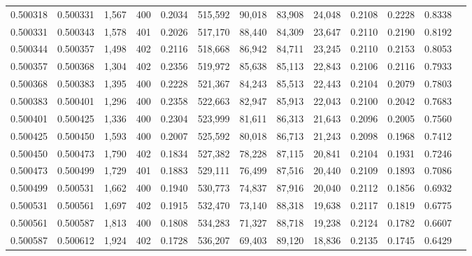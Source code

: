 \begin{tabular}{rrrrrrrrrrrrr}
0.500318 & 0.500331 & 1,567 & 400 &                                     0.2034 & 515,592 &  90,018 &  83,908 &  24,048 & 0.2108 & 0.2228 & 0.8338 \\
0.500331 & 0.500343 & 1,578 & 401 &                                     0.2026 & 517,170 &  88,440 &  84,309 &  23,647 & 0.2110 & 0.2190 & 0.8192 \\
0.500344 & 0.500357 & 1,498 & 402 &                                     0.2116 & 518,668 &  86,942 &  84,711 &  23,245 & 0.2110 & 0.2153 & 0.8053 \\
0.500357 & 0.500368 & 1,304 & 402 &                                     0.2356 & 519,972 &  85,638 &  85,113 &  22,843 & 0.2106 & 0.2116 & 0.7933 \\
0.500368 & 0.500383 & 1,395 & 400 &                                     0.2228 & 521,367 &  84,243 &  85,513 &  22,443 & 0.2104 & 0.2079 & 0.7803 \\
0.500383 & 0.500401 & 1,296 & 400 &                                     0.2358 & 522,663 &  82,947 &  85,913 &  22,043 & 0.2100 & 0.2042 & 0.7683 \\
0.500401 & 0.500425 & 1,336 & 400 &                                     0.2304 & 523,999 &  81,611 &  86,313 &  21,643 & 0.2096 & 0.2005 & 0.7560 \\
0.500425 & 0.500450 & 1,593 & 400 &                                     0.2007 & 525,592 &  80,018 &  86,713 &  21,243 & 0.2098 & 0.1968 & 0.7412 \\
0.500450 & 0.500473 & 1,790 & 402 &                                     0.1834 & 527,382 &  78,228 &  87,115 &  20,841 & 0.2104 & 0.1931 & 0.7246 \\
0.500473 & 0.500499 & 1,729 & 401 &                                     0.1883 & 529,111 &  76,499 &  87,516 &  20,440 & 0.2109 & 0.1893 & 0.7086 \\
0.500499 & 0.500531 & 1,662 & 400 &                                     0.1940 & 530,773 &  74,837 &  87,916 &  20,040 & 0.2112 & 0.1856 & 0.6932 \\
0.500531 & 0.500561 & 1,697 & 402 &                                     0.1915 & 532,470 &  73,140 &  88,318 &  19,638 & 0.2117 & 0.1819 & 0.6775 \\
0.500561 & 0.500587 & 1,813 & 400 &                                     0.1808 & 534,283 &  71,327 &  88,718 &  19,238 & 0.2124 & 0.1782 & 0.6607 \\
0.500587 & 0.500612 & 1,924 & 402 &                                     0.1728 & 536,207 &  69,403 &  89,120 &  18,836 & 0.2135 & 0.1745 & 0.6429 \\

\end{tabular}
